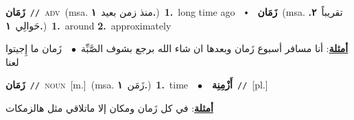 \documentclass[10pt,a4paper,twoside]{article} %
\begin{document}
\begin{multicols}{2}
{\setlength\topsep{0pt}\textbf{\foreignlanguage{arabic}{زَمَان}}\ {\color{gray}\texttt{//}\color{black}}\ \textsc{adv}\ \color{gray}(msa. \foreignlanguage{arabic}{منذ زمن بعيد}~\foreignlanguage{arabic}{\textbf{١.}})\color{black}\ \textbf{1.}~long time ago\ \ $\smblkdiamond$\ \ \setlength\topsep{0pt}\textbf{\foreignlanguage{arabic}{زَمَان}}\ \color{gray}(msa. \foreignlanguage{arabic}{تقريباً}~\foreignlanguage{arabic}{\textbf{٢.}}  \foreignlanguage{arabic}{حَوالِي}~\foreignlanguage{arabic}{\textbf{١.}})\color{black}\ \textbf{1.}~around  \textbf{2.}~approximately\  \begin{flushright}\color{gray}\foreignlanguage{arabic}{\textbf{\underline{\foreignlanguage{arabic}{أمثلة}}}: أنا مسافر أسبوع زَمان وبعدها ان شاء الله برجع بشوف الصَّبِّة\ $\bullet$\ \  زَمان ما إِجيتوا لعنا}\end{flushright}\color{black}} \vspace{2mm}

{\setlength\topsep{0pt}\textbf{\foreignlanguage{arabic}{زَمَان}}\ {\color{gray}\texttt{//}\color{black}}\ \textsc{noun}\ [m.]\ \color{gray}(msa. \foreignlanguage{arabic}{زَمَن}~\foreignlanguage{arabic}{\textbf{١.}})\color{black}\ \textbf{1.}~time\ \ $\bullet$\ \ \setlength\topsep{0pt}\textbf{\foreignlanguage{arabic}{أَزْمِنِة}}\ {\color{gray}\texttt{//}\color{black}}\ [pl.]\  \begin{flushright}\color{gray}\foreignlanguage{arabic}{\textbf{\underline{\foreignlanguage{arabic}{أمثلة}}}: في كل زَمان ومكان إلا ماتلاقي مثل هالزمكات}\end{flushright}\color{black}} \vspace{2mm}


\end{multicols}
\end{document}
